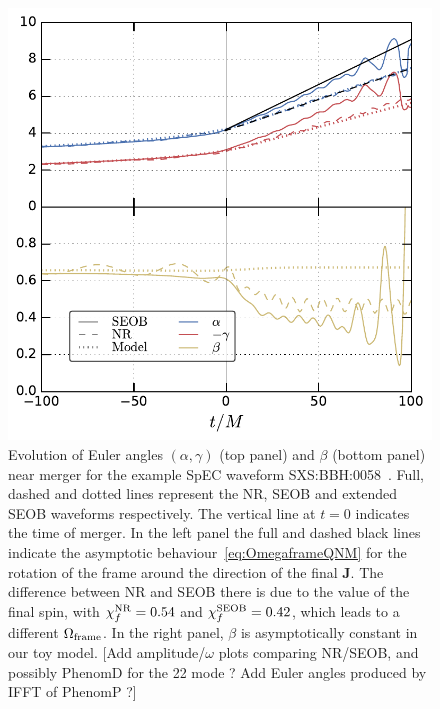 \documentclass[aps,showpacs,twocolumn,
prd,superscriptaddress,nofootinbib]{revtex4-1}
\newcommand{\SM}[1]{{\color{Red} #1}}
\begin{document}
\begin{figure}
  \centering
  \includegraphics[width=.98\linewidth]{plots/eulerSXS0058_py.pdf}
  \caption{Evolution of Euler angles $(\alpha, \gamma)$ (top panel) and $\beta$ (bottom panel) near merger for the example SpEC waveform SXS:BBH:0058~\cite{SpEC, SXScatalog, Mroue+12, Mroue+13}. Full, dashed and dotted lines represent the NR, SEOB and extended SEOB waveforms respectively. The vertical line at $t=0$ indicates the time of merger. In the left panel the full and dashed black lines indicate the asymptotic behaviour~\eqref{eq:OmegaframeQNM} for the rotation of the frame around the direction of the final $\bm{J}$. The difference between NR and SEOB there is due to the value of the final spin, with $\chi_{f}^{\rm NR} = 0.54$ and $\chi_{f}^{\rm SEOB} = 0.42$, which leads to a different $\Omega_{\rm frame}$. In the right panel, $\beta$ is asymptotically constant in our toy model. \SM{[Add amplitude/$\omega$ plots comparing NR/SEOB, and possibly PhenomD for the 22 mode ? Add Euler angles produced by IFFT of PhenomP ?]}}
  \label{fig:precmodel}
\end{figure}

\end{document}

